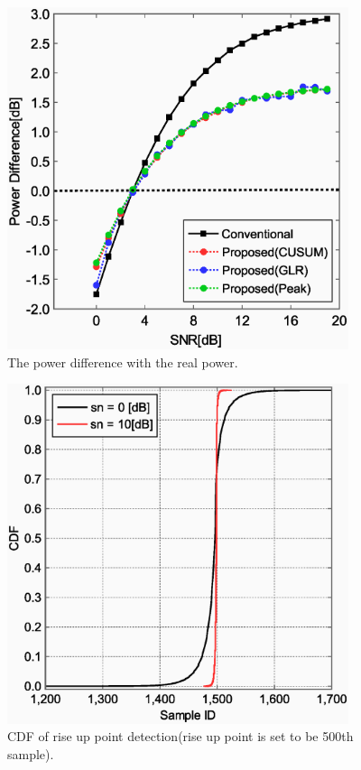 \begin{figure}[t]
\centering
\includegraphics[width=100mm]{peak.eps}
\caption{The power difference with the real power.}
\label{Powdiff}
\end{figure}

\begin{figure}[t]
\centering
\includegraphics[width=100mm]{cdf_OFF2ON.eps}
\caption{CDF of rise up point detection(rise up point is set to be 500th sample).}
\label{cdf_off2on}
\end{figure}


